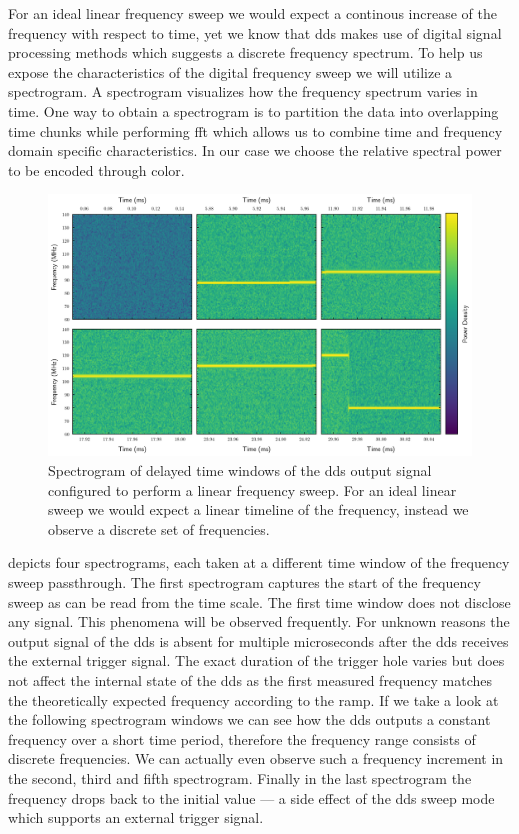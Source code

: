 For an ideal linear frequency sweep we would expect a continous increase of
the frequency with respect to time, yet we know that \gls{dds} makes use of
digital signal processing methods which suggests a discrete frequency
spectrum. To help us expose the characteristics of the digital frequency
sweep we will utilize a spectrogram. A spectrogram visualizes how the
frequency spectrum varies in time. One way to obtain a spectrogram is to
partition the data into overlapping time chunks while performing \gls{fft}
which allows us to combine time and frequency domain specific
characteristics. In our case we choose the relative spectral power to be
encoded through color.
\begin{figure}[htb]
  \centering
  \includegraphics[width=\textwidth]{../figure/signal/synthesis/spectrogram.png}
  \caption{Spectrogram of delayed time windows of the \gls{dds} output signal
    configured to perform a linear frequency sweep. For an ideal linear sweep
    we would expect a linear timeline of the frequency, instead we observe a
    discrete set of frequencies.
  }\label{fig:signal_synthesis_spectrogram}
\end{figure}
 depicts four spectrograms, each taken
at a different time window of the frequency sweep passthrough. The first
spectrogram captures the start of the frequency sweep as can be read from
the time scale. The first time window does not disclose any signal. This
phenomena will be observed frequently. For unknown reasons the output signal
of the \gls{dds} is absent for multiple microseconds after the \gls{dds}
receives the external trigger signal. The exact duration of the trigger hole
varies but does not affect the internal state of the \gls{dds} as the first
measured frequency matches the theoretically expected frequency according to
the ramp. If we take a look at the following spectrogram windows we can see
how the \gls{dds} outputs a constant frequency over a short time period,
therefore the frequency range consists of discrete frequencies. We can
actually even observe such a frequency increment in the second, third and
fifth spectrogram. Finally in the last spectrogram the frequency drops back
to the initial value --- a side effect of the \gls{dds} sweep mode which
supports an external trigger signal.

